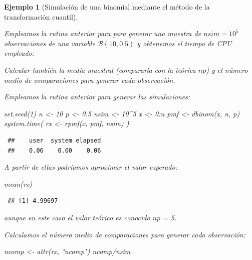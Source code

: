 \documentclass[
]{book}
\newenvironment{Shaded}{\begin{snugshade}}{\end{snugshade}}
\newcommand{\DecValTok}[1]{\textcolor[rgb]{0.00,0.00,0.81}{#1}}
\newcommand{\FloatTok}[1]{\textcolor[rgb]{0.00,0.00,0.81}{#1}}
\newcommand{\FunctionTok}[1]{\textcolor[rgb]{0.00,0.00,0.00}{#1}}
\newcommand{\NormalTok}[1]{#1}
\newcommand{\OtherTok}[1]{\textcolor[rgb]{0.56,0.35,0.01}{#1}}
\newcommand{\SpecialCharTok}[1]{\textcolor[rgb]{0.00,0.00,0.00}{#1}}
\newcommand{\StringTok}[1]{\textcolor[rgb]{0.31,0.60,0.02}{#1}}
\theoremstyle{break}
\newtheorem{example}{Ejemplo}[chapter]
\theoremstyle{nonumberplain}
\begin{document}
\begin{example}[Simulación de una binomial mediante el método de la transformación cuantil]
\protect\hypertarget{exm:binom-cuant}{}\label{exm:binom-cuant}

Empleamos la rutina anterior para para generar una muestra de \(nsim=10^{5}\) observaciones de una variable \(\mathcal{B}(10,0.5)\) y obtenemos el tiempo de CPU empleado:

Calcular también la
media muestral (compararla con la teórica \(np\)) y el número
medio de comparaciones para generar cada observación.

Empleamos la rutina anterior para generar las simulaciones:

\begin{Shaded}
\begin{Highlighting}[]
\FunctionTok{set.seed}\NormalTok{(}\DecValTok{1}\NormalTok{)}
\NormalTok{n }\OtherTok{\textless{}{-}} \DecValTok{10}
\NormalTok{p }\OtherTok{\textless{}{-}} \FloatTok{0.5}
\NormalTok{nsim }\OtherTok{\textless{}{-}} \DecValTok{10}\SpecialCharTok{\^{}}\DecValTok{5}
\NormalTok{x }\OtherTok{\textless{}{-}} \DecValTok{0}\SpecialCharTok{:}\NormalTok{n}
\NormalTok{pmf }\OtherTok{\textless{}{-}} \FunctionTok{dbinom}\NormalTok{(x, n, p)}
\FunctionTok{system.time}\NormalTok{( rx }\OtherTok{\textless{}{-}} \FunctionTok{rpmf}\NormalTok{(x, pmf, nsim) )}
\end{Highlighting}
\end{Shaded}

\begin{verbatim}
 ##    user  system elapsed 
 ##    0.06    0.00    0.06
\end{verbatim}

A partir de ellas podríamos aproximar el valor esperado:

\begin{Shaded}
\begin{Highlighting}[]
\FunctionTok{mean}\NormalTok{(rx)}
\end{Highlighting}
\end{Shaded}

\begin{verbatim}
 ## [1] 4.99697
\end{verbatim}

aunque en este caso el valor teórico es conocido \(np\) = 5.

Calculamos el número medio de comparaciones para generar cada observación:

\begin{Shaded}
\begin{Highlighting}[]
\NormalTok{ncomp }\OtherTok{\textless{}{-}} \FunctionTok{attr}\NormalTok{(rx, }\StringTok{"ncomp"}\NormalTok{)}
\NormalTok{ncomp}\SpecialCharTok{/}\NormalTok{nsim}
\end{Highlighting}
\end{Shaded}


\end{example}
\end{document}
